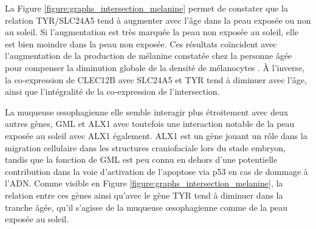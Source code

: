 La Figure \ref{figure:graphs_intersection_melanine} permet de constater que la relation TYR/SLC24A5 tend à augmenter avec l'âge dans la peau exposée ou non au soleil. Si l'augmentation est très marquée la peau non exposée au soleil, elle est bien moindre dans la peau non exposée. Ces résultats coïncident avec l'augmentation de la production de mélanine constatée chez la personne âgée pour compenser la diminution globale de la densité de mélanocytes . À l'inverse, la co-expression de CLEC12B avec SLC24A5 et TYR tend à diminuer avec l'âge, ainsi que l'intégralité de la co-expression de l'intersection.

La muqueuse œsophagienne elle semble interagir plus étroitement avec deux autres gènes, GML et ALX1 avec toutefois une interaction notable de la peau exposée au soleil avec ALX1 également. ALX1 est un gène jouant un rôle dans la migration cellulaire dans les structures craniofaciale lors du stade embryon, tandis que la fonction de GML est peu connu en dehors d'une potentielle contribution dans la voie d'activation de l'apoptose via p53 en cas de dommage à l'ADN. Comme visible en Figure \ref{figure:graphs_intersection_melanine}, la relation entre ces gènes ainsi qu'avec le gène TYR tend à diminuer dans la tranche âgée, qu'il s'agisse de la muqueuse œsophagienne comme de la peau exposée au soleil.





